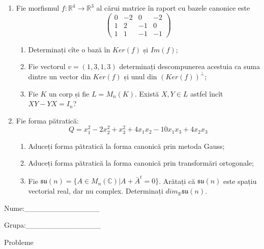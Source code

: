 \documentclass{article}
\begin{document}
\begin{enumerate}
 \item Fie morfismul $f:\mathbb{R}^4 \to \mathbb{R}^3$ al cărui matrice în raport cu bazele canonice este
$$\begin{pmatrix}
0&-2&0&-2\\
1&2&-1&0\\
1&1&-1&-1
\end{pmatrix}$$

\begin{enumerate}
\item Determinați cîte o bază în $Ker(f)$ și $Im(f)$;
\item Fie vectorul $v=(1,3,1,3)$ determinați descompunerea acestuia ca suma dintre un vector din $Ker(f)$ și unul din $(Ker(f))^\perp$;
\item Fie $K$ un corp și fie $L=M_n(K)$. Există $X,Y \in L$ astfel încît $XY-YX=I_n$?  
\end{enumerate}
\item Fie forma pătratică:
$$Q= x_1^2-2x_2^2+x_3^2+4x_1x_2-10x_1x_3+4x_2x_3$$

\begin{enumerate}
\item Aduceți forma pătratică la forma canonică prin metoda Gauss;
\item Aduceți forma pătratică la forma canonică prin transformări ortogonale;
\item Fie $\mathfrak{su}(n)=\{ A \in M_n(\mathbb{C}) | A+\bar{A}^t=0\}$. Arătați că $\mathfrak{su}(n)$ este spațiu vectorial real, dar nu complex.
Determinați $dim_{\mathbb{R}}\mathfrak{su}(n)$.
\end{enumerate}
\end{enumerate}
\newpage
\begin{flushright}
Nume:\_\_\_\_\_\_\_\_\_\_\_\_\_\_
 
 
Grupa:\_\_\_\_\_\_\_\_\_\_\_\_\_\_
\end{flushright}
\begin{center}
\vspace{2cm}
{\Large Probleme}
\vspace{2cm}
\end{center}
\end{document}

